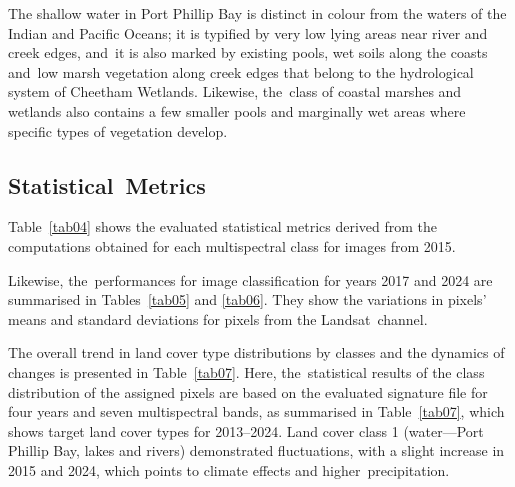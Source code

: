 \documentclass[jmse,article,accept,pdftex,oneauthor]{Definitions/mdpi}
\begin{document}
The shallow water in Port Phillip Bay is distinct in colour from the waters of the Indian and Pacific Oceans; it is typified by very low lying areas near river and creek edges, and~it is also marked by existing pools, wet soils along the coasts and~low marsh vegetation along creek edges that belong to the hydrological system of Cheetham Wetlands. Likewise, the~class of coastal marshes and wetlands also contains a few smaller pools and marginally wet areas where specific types of vegetation develop.



\subsection{Statistical~Metrics}
Table~\ref{tab04} shows the evaluated statistical metrics derived from the computations obtained for each multispectral class for images from 2015.%

Likewise, the~performances for image classification for years 2017 and 2024 are summarised in Tables~\ref{tab05} and \ref{tab06}. They show the variations in pixels' means and standard deviations for pixels from the Landsat~channel. %

The overall trend in land cover type distributions by classes and the dynamics of changes is presented in Table~\ref{tab07}. Here, the~statistical results of the class distribution of the assigned pixels are based on the evaluated signature file for four years and seven multispectral bands, as summarised in Table~\ref{tab07}, which shows %
target land cover types for 2013--2024. Land cover class 1 (water---Port Phillip Bay, lakes and rivers) demonstrated fluctuations, with a slight increase in 2015 and 2024, which points to climate effects and higher~precipitation. 
\end{document}
